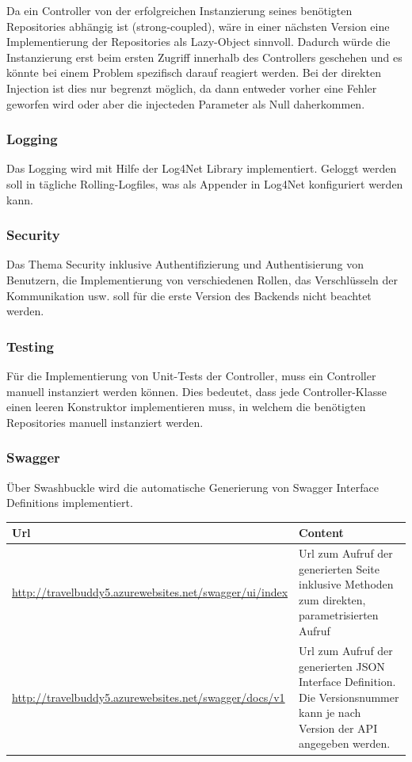 \documentclass[a4paper,10pt,xetex]{article}
\begin{document}
Da ein Controller von der erfolgreichen Instanzierung seines ben\"otigten Repositories abh\"angig ist (strong-coupled),
w\"are in einer n\"achsten Version eine Implementierung der Repositories als Lazy-Object sinnvoll. Dadurch w\"urde die
Instanzierung erst beim ersten Zugriff innerhalb des Controllers geschehen und es k\"onnte bei einem Problem spezifisch
darauf reagiert werden. Bei der direkten Injection ist dies nur begrenzt m\"oglich, da dann entweder vorher eine Fehler
geworfen wird oder aber die injecteden Parameter als Null daherkommen.

\subsubsection{Logging}\label{logging}
Das Logging wird mit Hilfe der Log4Net Library implementiert. Geloggt werden soll in t\"agliche Rolling-Logfiles, was
als Appender in Log4Net konfiguriert werden kann.

\subsubsection{Security}\label{security}
Das Thema Security inklusive Authentifizierung und Authentisierung von Benutzern, die Implementierung von verschiedenen
Rollen, das Verschl\"usseln der Kommunikation usw. soll f\"ur die erste Version des Backends nicht beachtet werden.

\subsubsection{Testing}\label{testing}
F\"ur die Implementierung von Unit-Tests der Controller, muss ein Controller manuell instanziert werden k\"onnen. Dies
bedeutet, dass jede Controller-Klasse einen leeren Konstruktor implementieren muss, in welchem die ben\"otigten
Repositories manuell instanziert werden.

\subsubsection{Swagger}\label{swagger}
\"Uber Swashbuckle wird die automatische Generierung von Swagger Interface Definitions implementiert.

\begin{longtabu} to \textwidth { | l | X[l] | }
\hline
\textbf{Url}  & \textbf{Content} \\
\hline
\endhead

\url{http://travelbuddy5.azurewebsites.net/swagger/ui/index} &
Url zum Aufruf der generierten Seite inklusive Methoden zum direkten, parametrisierten
  Aufruf\\\hline
\url{http://travelbuddy5.azurewebsites.net/swagger/docs/v1} &
Url zum Aufruf der generierten JSON Interface Definition. Die Versionsnummer kann je nach
  Version der API angegeben werden.\\\hline
\end{longtabu}
\end{document}
